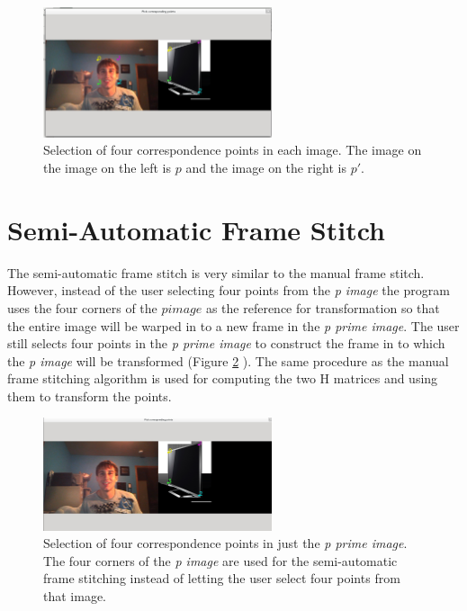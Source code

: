 \documentclass[10pt,twocolumn,letterpaper]{article}
\begin{document}
\begin{figure}[ht!]
\centering
\includegraphics[width=0.6\textwidth]{img/man_frame_points.eps}
\caption{Selection of four correspondence points in each image. The image on the image on the left is $p$ and the image on the right is $p'$.}
\label{fig:man_frame_points}
\end{figure}


\section{ Semi-Automatic Frame Stitch }
The semi-automatic frame stitch is very similar to the manual frame stitch. However, instead of the user selecting four points from the \emph{p image} the program uses the four corners of the $p image$ as the reference for transformation so that the entire image will be warped in to a new frame in the \emph{ p prime image}. The user still selects four points in the \emph{p prime image} to construct the frame in to which the \emph{p image} will be transformed (Figure \ref{fig:semi_auto_frame_points} ). The same procedure as the manual frame stitching algorithm is used for computing the two H matrices and using them to transform the points. 

\begin{figure}[ht!]
\centering
\includegraphics[width=0.6\textwidth]{img/semi_auto_frame_points.eps}
\caption{Selection of four correspondence points in just the \emph{p prime image}. The four corners of the \emph{p image} are used for the semi-automatic frame stitching instead of letting the user select four points from that image.}
\label{fig:semi_auto_frame_points}
\end{figure}
\end{document}
